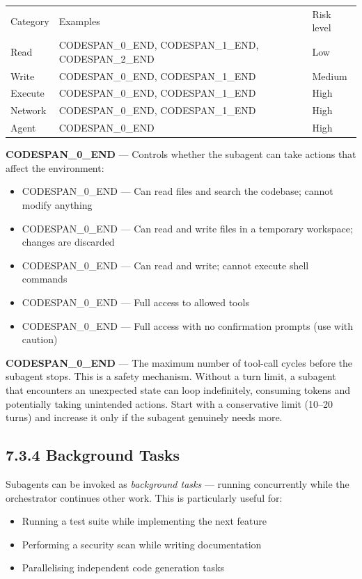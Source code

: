 \documentclass[11pt,a4paper]{book}
\begin{document}
\begin{tabular}{lll}
\hline
Category & Examples & Risk level \\
Read & CODESPAN\_0\_END, CODESPAN\_1\_END, CODESPAN\_2\_END & Low \\
Write & CODESPAN\_0\_END, CODESPAN\_1\_END & Medium \\
Execute & CODESPAN\_0\_END, CODESPAN\_1\_END & High \\
Network & CODESPAN\_0\_END, CODESPAN\_1\_END & High \\
Agent & CODESPAN\_0\_END & High \\
\hline
\end{tabular}

\textbf{CODESPAN\_0\_END} --- Controls whether the subagent can take actions that affect the environment:

\begin{itemize}
  \item CODESPAN\_0\_END --- Can read files and search the codebase; cannot modify anything
  \item CODESPAN\_0\_END --- Can read and write files in a temporary workspace; changes are discarded
  \item CODESPAN\_0\_END --- Can read and write; cannot execute shell commands
  \item CODESPAN\_0\_END --- Full access to allowed tools
  \item CODESPAN\_0\_END --- Full access with no confirmation prompts (use with caution)
\end{itemize}

\textbf{CODESPAN\_0\_END} --- The maximum number of tool-call cycles before the subagent stops. This is a safety mechanism. Without a turn limit, a subagent that encounters an unexpected state can loop indefinitely, consuming tokens and potentially taking unintended actions. Start with a conservative limit (10--20 turns) and increase it only if the subagent genuinely needs more.

\subsection{7.3.4 Background Tasks}

Subagents can be invoked as \textit{background tasks} --- running concurrently while the orchestrator continues other work. This is particularly useful for:

\begin{itemize}
  \item Running a test suite while implementing the next feature
  \item Performing a security scan while writing documentation
  \item Parallelising independent code generation tasks
\end{itemize}
\end{document}
